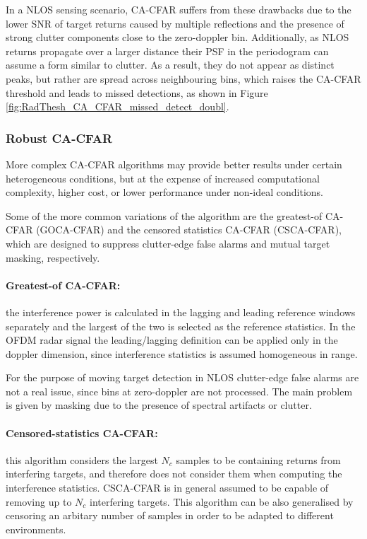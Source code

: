 	In a NLOS sensing scenario, CA-CFAR suffers from these drawbacks due to the lower SNR of target returns caused by multiple reflections and the presence of strong clutter components close to the zero-doppler bin. 
	Additionally, as NLOS returns propagate over a larger distance their PSF in the periodogram can assume a form similar to clutter. 
	As a result, they do not appear as distinct peaks, but rather are spread across neighbouring bins, which raises the CA-CFAR threshold and leads to missed detections, as shown in Figure \ref{fig:RadThesh_CA_CFAR_missed_detect_doubl}.

\subsubsection{Robust CA-CFAR}
More complex CA-CFAR algorithms may provide better results under certain heterogeneous conditions, but at the expense of increased computational complexity, higher cost, or lower performance under non-ideal conditions.

Some of the more common variations of the algorithm are the greatest-of CA-CFAR (GOCA-CFAR) and the censored statistics CA-CFAR (CSCA-CFAR), which are designed to suppress clutter-edge false alarms and mutual target masking, respectively.

\paragraph{Greatest-of CA-CFAR:}
the interference power is calculated in the lagging and leading reference windows separately and the largest of the two is selected as the reference statistics. In the OFDM radar signal the leading/lagging definition can be applied only in the doppler dimension, since interference statistics is assumed homogeneous in range.

For the purpose of moving target detection in NLOS clutter-edge false alarms are not a real issue, since bins at zero-doppler are not processed.
 The main problem is given by masking due to the presence of spectral artifacts or clutter.
 
 
\paragraph{Censored-statistics CA-CFAR:}
this algorithm considers the largest $N_c$ samples to be containing returns from interfering targets, and therefore does not consider them when computing the interference statistics. CSCA-CFAR is in general assumed to be capable of removing up to $N_c$ interfering targets.
This algorithm can be also generalised by censoring an arbitary number of samples in order to be adapted to different environments. 

